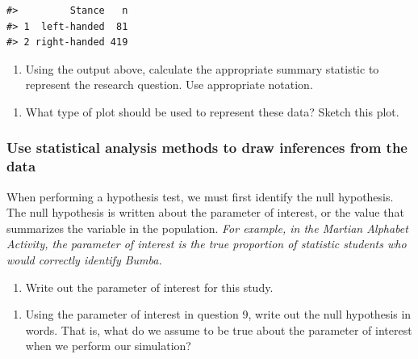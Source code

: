 \documentclass[
]{report}
\providecommand{\tightlist}{%
  \setlength{\itemsep}{0pt}\setlength{\parskip}{0pt}}
\begin{document}
\begin{verbatim}
#>         Stance   n
#> 1  left-handed  81
#> 2 right-handed 419
\end{verbatim}

\begin{enumerate}
\def\labelenumi{\arabic{enumi}.}
\setcounter{enumi}{6}
\tightlist
\item
  Using the output above, calculate the appropriate summary statistic to represent the research question. Use appropriate notation.
\end{enumerate}

\vspace{0.5in}

\begin{enumerate}
\def\labelenumi{\arabic{enumi}.}
\setcounter{enumi}{7}
\tightlist
\item
  What type of plot should be used to represent these data? Sketch this plot.
\end{enumerate}

\vspace{1.5in}

\hypertarget{use-statistical-analysis-methods-to-draw-inferences-from-the-data}{%
\subsubsection*{Use statistical analysis methods to draw inferences from the data}\label{use-statistical-analysis-methods-to-draw-inferences-from-the-data}}

When performing a hypothesis test, we must first identify the null hypothesis. The null hypothesis is written about the parameter of interest, or the value that summarizes the variable in the population. \emph{For example, in the Martian Alphabet Activity, the parameter of interest is the true proportion of statistic students who would correctly identify Bumba.}

\begin{enumerate}
\def\labelenumi{\arabic{enumi}.}
\setcounter{enumi}{8}
\tightlist
\item
  Write out the parameter of interest for this study.
\end{enumerate}

\vspace{0.8in}

\begin{enumerate}
\def\labelenumi{\arabic{enumi}.}
\setcounter{enumi}{9}
\tightlist
\item
  Using the parameter of interest in question 9, write out the null hypothesis in words. That is, what do we assume to be true about the parameter of interest when we perform our simulation?
\end{enumerate}
\end{document}
